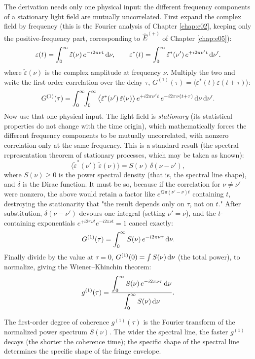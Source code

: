 The derivation needs only one physical input: the different frequency components of a stationary light field are mutually uncorrelated. First expand the complex field by frequency (this is the Fourier analysis of Chapter \ref{chap:e02}, keeping only the positive-frequency part, corresponding to \(\hat E^{(+)}\) of Chapter \ref{chap:e05}):
\[
  \varepsilon(t)=\int_0^\infty \tilde\varepsilon(\nu)\,e^{-i2\pi\nu t}\,{\rm d}\nu,
  \qquad
  \varepsilon^\ast(t)=\int_0^\infty \tilde\varepsilon^\ast(\nu')\,e^{+i2\pi\nu' t}\,{\rm d}\nu' .
\]
where \(\tilde\varepsilon(\nu)\) is the complex amplitude at frequency \(\nu\). Multiply the two and write the first-order correlation over the delay \(\tau\), \(G^{(1)}(\tau)=\langle\varepsilon^\ast(t)\varepsilon(t+\tau)\rangle\):
\[
  G^{(1)}(\tau)
  =\int_0^\infty\!\!\int_0^\infty
  \big\langle \tilde\varepsilon^\ast(\nu')\,\tilde\varepsilon(\nu)\big\rangle\,
  e^{+i2\pi\nu' t}\,e^{-i2\pi\nu(t+\tau)}\,{\rm d}\nu\,{\rm d}\nu' .
\]
Now use that one physical input. The light field is \emph{stationary} (its statistical properties do not change with the time origin), which mathematically forces the different frequency components to be mutually uncorrelated, with nonzero correlation only at the same frequency. This is a standard result (the spectral representation theorem of stationary processes, which may be taken as known):
\[
  \big\langle \tilde\varepsilon^\ast(\nu')\,\tilde\varepsilon(\nu)\big\rangle
  =S(\nu)\,\delta(\nu-\nu') ,
\]
where \(S(\nu)\ge0\) is the power spectral density (that is, the spectral line shape), and \(\delta\) is the Dirac function. It must be so, because if the correlation for \(\nu\ne\nu'\) were nonzero, the above would retain a factor like \(e^{i2\pi(\nu'-\nu)t}\) containing \(t\), destroying the stationarity that "the result depends only on \(\tau\), not on \(t\)." After substitution, \(\delta(\nu-\nu')\) devours one integral (setting \(\nu'=\nu\)), and the \(t\)-containing exponentials \(e^{+i2\pi\nu t}e^{-i2\pi\nu t}=1\) cancel exactly:
\[
  G^{(1)}(\tau)=\int_0^\infty S(\nu)\,e^{-i2\pi\nu\tau}\,{\rm d}\nu .
\]
Finally divide by the value at \(\tau=0\), \(G^{(1)}(0)=\int S(\nu)\,{\rm d}\nu\) (the total power), to normalize, giving the Wiener--Khinchin theorem:
\begin{equation}
  g^{(1)}(\tau)=
  \frac{\displaystyle\int_0^\infty S(\nu)\,e^{-i2\pi\nu\tau}\,{\rm d}\nu}
       {\displaystyle\int_0^\infty S(\nu)\,{\rm d}\nu} .
  \label{eq:e09-wiener-khinchin}
\end{equation}
\begin{formulaexplain}
The first-order degree of coherence \(g^{(1)}(\tau)\) is the Fourier transform of the normalized power spectrum \(S(\nu)\). The wider the spectral line, the faster \(g^{(1)}\) decays (the shorter the coherence time); the specific shape of the spectral line determines the specific shape of the fringe envelope.
\end{formulaexplain}
